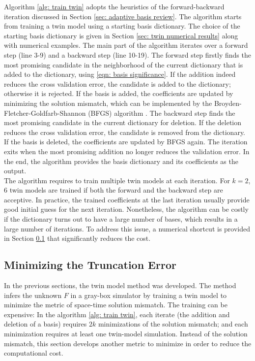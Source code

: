 Algorithm \ref{alg: train twin} adopts the heuristics of the forward-backward iteration
discussed in Section \ref{sec: adaptive basis review}.
The algorithm starts from training a twin model using 
a starting basis dictionary. 
The choice of the starting basis dictionary is given in Section 
\ref{sec: twin numerical results} along with numerical examples.
The main part of the algorithm iterates over a forward step (line 3-9) and a backward step (line
10-19). The forward step firstly finds the most promising candidate in the neighborhood of the current
dictionary that is added to the dictionary, using \eqref{eqn: basis significance}.
If the addition indeed reduces the cross validation error, the candidate is added 
to the dictionary; otherwise it is rejected. 
If the basis is added, the coefficients are updated by minimizing the solution mismatch, which can be
implemented by the Broyden-Fletcher-Goldfarb-Shannon (BFGS) algorithm \cite{quasiNewton}.
The backward step finds the most promising
candidate in the current dictionary for deletion. 
If the deletion reduces the cross validation error, the candidate
is removed from the dictionary. 
If the basis is deleted, the coefficients are updated by BFGS again.
The iteration exits when the most promising addition no longer 
reduces the validation error. In the end, the algorithm provides the basis dictionary and its
coefficients as the output.\\

The algorithm requires to train multiple twin models at each iteration. For
$k=2$, $6$ twin models are trained if both the forward and the backward step are acceptive.
In practice, the trained coefficients at the last iteration usually provide good initial guess
for the next iteration. Nonetheless, the algorithm can be costly if the dictionary turns out
to have a large number of bases, which results in a large number of iterations. 
To address this issue, a numerical shortcut is provided in Section 
\ref{sec: trunc error} that significantly reduces the cost.\\

\subsection{Minimizing the Truncation Error}
\label{sec: trunc error}
In the previous sections, the twin model method was developed. The method infers the unknown
$F$ in a gray-box simulator by training a twin model to minimize the metric of
space-time solution mismatch.
The training can be expensive: In the algorithm \ref{alg: train twin}, each iterate
(the addition and deletion of a basis) requires $2k$ minimizations
of the solution mismatch; and each minimization requires at least one twin-model simulation.
Instead of the solution mismatch, this section develops another metric to minimize in order
to reduce the computational cost.\\

